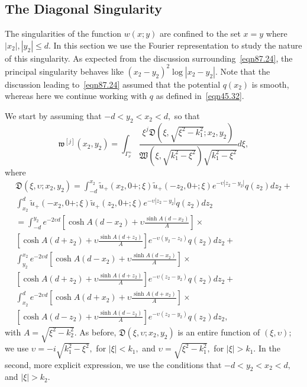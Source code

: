 \documentclass[11pt]{article}
\newcommand\fw{\mathfrak w}
\newcommand\fW{\mathfrak W}
\newcommand\tu{\widetilde u}
\newcommand\fD{\mathfrak D}
\theoremstyle{definition}
\theoremstyle{remark}
\begin{document}
   \subsection{The Diagonal Singularity}
   The singularities of the function $w(x;y)$ are confined to the set $x=y$
   where $|x_2|,|y_2|\leq d.$ In this section we use the Fourier representation
   to study the nature of this singularity.  As expected from the discussion
   surrounding~\eqref{eqn87.24}, the principal singularity behaves like
   $(x_2-y_2)^2\log|x_2-y_2|.$ Note that the discussion leading
   to~\eqref{eqn87.24} assumed that the potential $q(x_2)$ is smooth, whereas
   here we continue working with $q$ as defined in~\eqref{eqn45.32}.

   We start by assuming that $-d<y_2<x_2<d,$ so that
   \begin{equation}\label{eqn166.24}
     \fw^{[j]}(x_2,y_2)=\int_{\Gamma_{\nu}^+}\frac{\xi^j\fD(\xi,\sqrt{\xi^2-k_1^2};x_2,y_2)}
        {\fW(\xi,\sqrt{k_1^2-\xi^2})\sqrt{k_1^2-\xi^2}}d\xi,
   \end{equation}
   where
   \begin{multline}\label{eqn266.667}
  \fD(\xi,\upsilon;x_2,y_2)=
  \int_{-d}^{x_2}\tu_+(x_2,0+;\xi)\tu_+(-z_2,0+;\xi)e^{-\upsilon|z_2-y_2|}q(z_2)dz_2+\\
  \int_{x_2}^{d}\tu_+(-x_2,0+;\xi)\tu_+(z_2,0+;\xi)e^{-\upsilon|z_2-y_2|}q(z_2)dz_2\\
  =\int_{-d}^{y_2}e^{-2\upsilon d}\left[\cosh A(d-x_2)+\upsilon\frac{\sinh
      A(d-x_2)}{A}\right]\times \\\left[\cosh A(d+z_2)+\upsilon\frac{\sinh
      A(d+z_2)}{A}\right]
  e^{-\upsilon(y_2-z_2)}q(z_2)dz_2+\\
  \int_{y_2}^{x_2}e^{-2\upsilon d}\left[\cosh A(d-x_2)+\upsilon\frac{\sinh
      A(d-x_2)}{A}\right]\times \\\left[\cosh A(d+z_2)+\upsilon\frac{\sinh
      A(d+z_2)}{A}\right]
  e^{-\upsilon(z_2-y_2)}q(z_2)dz_2+\\
   \int_{x_2}^{d}e^{-2\upsilon d}\left[\cosh A(d+x_2)+\upsilon\frac{\sinh
      A(d+x_2)}{A}\right]\times \\\left[\cosh A(d-z_2)+\upsilon\frac{\sinh
      A(d-z_2)}{A}\right]
  e^{-\upsilon(z_2-y_2)}q(z_2)dz_2,
   \end{multline}
   with $A=\sqrt{\xi^2-k_2^2}.$ As before, $\fD(\xi,\upsilon;x_2,y_2)$ is an entire
   function of $(\xi,\upsilon);$ we use $\upsilon=-i\sqrt{k_1^2-\xi^2},$ for
   $|\xi|<k_1,$ and $\upsilon=\sqrt{\xi^2-k_1^2},$ for $|\xi|>k_1.$ In the second,
   more explicit expression, we use the conditions that $-d<y_2<x_2<d,$ and
   $|\xi|>k_2.$
\end{document}
